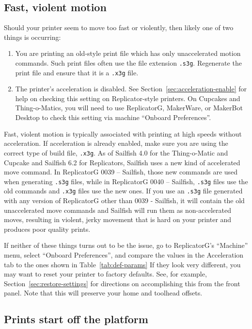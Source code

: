 \subsection{Fast, violent motion}

Should your printer seem to move too fast or violently, then likely one of
two things is occurring:

\begin{enumerate}
\item You are printing an old-style print file which has only unaccelerated
motion commands.  Such print files often use the file extension \texttt{.s3g}.
Regenerate the print file and ensure that it is a \texttt{.x3g} file.
\item The printer's acceleration is disabled.
See Section~\ref{sec:acceleration-enable} for help on checking this setting
on Replicator-style printers.  On Cupcakes and Thing-o-Matics, you will need
to use ReplicatorG, MakerWare, or MakerBot Desktop to check this setting via
machine ``Onboard Preferences''.
\end{enumerate}

Fast, violent motion is typically associated with printing at high
speeds without acceleration.  If acceleration is already enabled, make
sure you are using the correct type of build file, \texttt{.x3g}. As
of Sailfish 4.0 for the Thing-o-Matic and Cupcake and Sailfish 6.2 for
Replicators, Sailfish uses a new kind of accelerated move
command.  In ReplicatorG 0039 -- Sailfish, those new commands are used
when generating \texttt{.s3g} files, while in ReplicatorG 0040 -- Sailfish,
\texttt{.s3g} files use the old commands and \texttt{.x3g} files use the new
ones. If you use an \texttt{.s3g} file generated with any version of
ReplicatorG other than 0039 - Sailfish, it will contain the old
unaccelerated move commands and Sailfish will run them as
non-accelerated moves, resulting in violent, jerky movement that is
hard on your printer and produces poor quality prints.

If neither of these things turns out to be the issue, go to
ReplicatorG's ``Machine'' menu, select ``Onboard Preferences'', and compare
the values in the Acceleration tab to the ones shown in Table~\ref{tab:def-params}
If they look very different, you may want to reset your printer to factory
defaults.  See, for example, Section~\ref{sec:restore-settings} for directions
on accomplishing this from the front panel.  Note that this will preserve your home
and toolhead offsets.

\subsection{Prints start off the platform}

